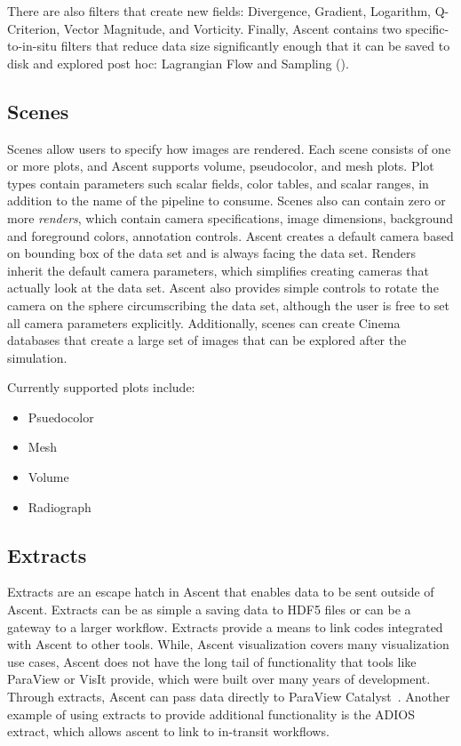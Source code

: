 There are also filters that create new fields: Divergence, Gradient, Logarithm, Q-Criterion, Vector Magnitude, and Vorticity.
%
Finally, Ascent contains two specific-to-in-situ filters that
reduce data size significantly enough that it can be saved to disk and explored post hoc:
Lagrangian Flow and Sampling ().


\subsection{Scenes}

Scenes allow users to specify how images are rendered.
%
Each scene consists of one or more plots, and Ascent supports volume,
pseudocolor, and mesh plots.
%
Plot types contain parameters such scalar fields, color tables, and scalar ranges,
in addition to the name of the pipeline to consume.
%
Scenes also can contain zero or more \textit{renders}, which contain
camera specifications, image dimensions, background and
foreground colors, annotation controls.
%
Ascent creates a default camera based on bounding box of the data set and
is always facing the data set.
%
Renders inherit the default camera parameters, which simplifies creating
cameras that actually look at the data set.
%
Ascent also provides simple controls to rotate the camera on the
sphere circumscribing the data set, although the user is free to set all
camera parameters explicitly.
%
Additionally, scenes can create Cinema~\cite{AhrensCinema} databases that
create a large set of images that can be explored after the simulation.

Currently supported plots include:
\begin{itemize}
\item Psuedocolor
\item Mesh
\item Volume
\item Radiograph
\end{itemize}

\subsection{Extracts}
Extracts are an escape hatch in Ascent that enables data to be sent
outside of Ascent.
%
Extracts can be as simple a saving data to HDF5 files or can be a gateway
to a larger workflow.
Extracts provide a means to link codes integrated with Ascent to other tools.
%
While, Ascent visualization covers many visualization use cases,
Ascent does not have the long tail of functionality that tools like ParaView or VisIt provide, which
were built over many years of development.
%
Through extracts, Ascent can pass data directly to ParaView Catalyst~\cite{Catalyst}.
%
Another example of using extracts to provide additional functionality is the
ADIOS~\cite{Lofstead2008} extract, which allows ascent to link to in-transit workflows.

